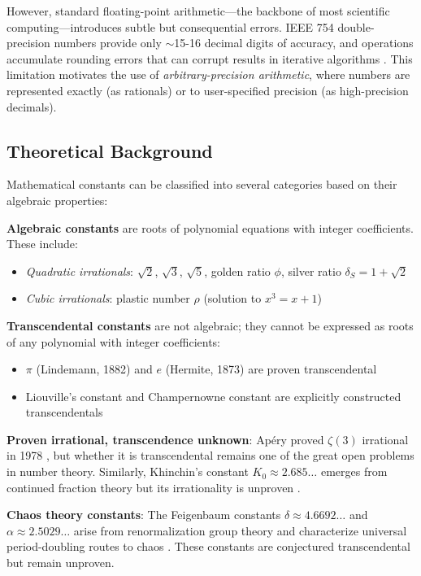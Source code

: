 \documentclass[11pt,a4paper]{article}
\begin{document}
However, standard floating-point arithmetic—the backbone of most scientific computing—introduces subtle but consequential errors. IEEE 754 double-precision numbers provide only $\sim$15-16 decimal digits of accuracy, and operations accumulate rounding errors that can corrupt results in iterative algorithms \citep{johansson2021gamma}. This limitation motivates the use of \textit{arbitrary-precision arithmetic}, where numbers are represented exactly (as rationals) or to user-specified precision (as high-precision decimals).

\subsection{Theoretical Background}

Mathematical constants can be classified into several categories based on their algebraic properties:

\textbf{Algebraic constants} are roots of polynomial equations with integer coefficients. These include:
\begin{itemize}
    \item \textit{Quadratic irrationals}: $\sqrt{2}$, $\sqrt{3}$, $\sqrt{5}$, golden ratio $\phi$, silver ratio $\delta_S = 1 + \sqrt{2}$
    \item \textit{Cubic irrationals}: plastic number $\rho$ (solution to $x^3 = x + 1$)
\end{itemize}

\textbf{Transcendental constants} are not algebraic; they cannot be expressed as roots of any polynomial with integer coefficients:
\begin{itemize}
    \item $\pi$ (Lindemann, 1882) and $e$ (Hermite, 1873) are proven transcendental
    \item Liouville's constant and Champernowne constant are explicitly constructed transcendentals
\end{itemize}

\textbf{Proven irrational, transcendence unknown}: Apéry proved $\zeta(3)$ irrational in 1978 \citep{apery1979}, but whether it is transcendental remains one of the great open problems in number theory. Similarly, Khinchin's constant $K_0 \approx 2.685\ldots$ emerges from continued fraction theory but its irrationality is unproven \citep{wolf2020khinchin}.

\textbf{Chaos theory constants}: The Feigenbaum constants $\delta \approx 4.6692\ldots$ and $\alpha \approx 2.5029\ldots$ arise from renormalization group theory and characterize universal period-doubling routes to chaos \citep{feigenbaum1978,wang2025feigenbaum}. These constants are conjectured transcendental but remain unproven.
\end{document}
